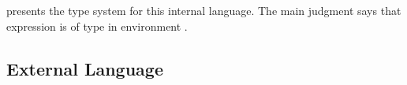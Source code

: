 presents the type system for this internal language.
The main judgment
\ltitjudgement{\ltiEnv{}}{\ltiE{}}{\ltiT{}} 
says that expression \ltiE{} is of type \ltiT{}
in environment \ltiEnv{}.

\subsection{External Language}

\begin{figure}
$$
\begin{array}{lrll}

\end{array}$$
\end{figure}
